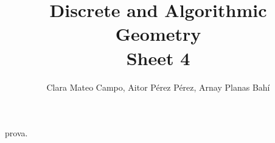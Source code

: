 \documentclass[10pt]{article}
\title{Discrete and Algorithmic Geometry \\Sheet 4}
\author{Clara Mateo Campo, Aitor P\'erez P\'erez, Arnay Planas Bah\'i}
\date{}
\begin{document}
\maketitle

prova.
\end{document}
